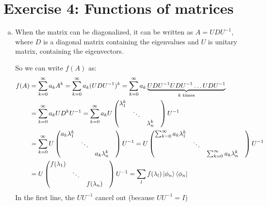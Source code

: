 \documentclass[a4paper,german,12pt,smallheadings]{scrartcl}
\begin{document}
\section*{Exercise 4: Functions of matrices}
\begin{enumerate}[a)]
  \item
    When the matrix can be diagonalized, it can be written as $A = UDU^{-1}$,
    where $D$ is a diagonal matrix containing the eigenvalues and $U$ is
    unitary matrix, containing the eigenvectors.

    So we can write $f(A)$ as:
    \begin{align*}
      f(A)
      &= \sum_{k=0}^{\infty} a_k A^k 
      = \sum_{k=0}^{\infty} a_k (UDU^{-1})^k
      = \sum_{k=0}^{\infty} a_k \underbrace{UDU^{-1}UDU^{-1} \dots UDU^{-1}}_{k\text{ times}} \\
      &= \sum_{k=0}^{\infty} a_k UD^kU^{-1}
      = \sum_{k=0}^{\infty} a_k U 
      \begin{pmatrix} 
        \lambda_1^k &             & \\
                   & \ddots      & \\
                   &             & \lambda_n^k & \\
      \end{pmatrix} 
      U^{-1} \\
      &= \sum_{k=0}^{\infty} U 
      \begin{pmatrix} 
        a_k \lambda_1^k &             & \\
                   & \ddots      & \\
                   &             & a_k\lambda_n^k & \\
      \end{pmatrix} 
      U^{-1}
      = U
      \begin{pmatrix} 
        \sum_{k=0}^{\infty }a_k \lambda_1^k &             & \\
                   & \ddots      & \\
                   &             & \sum_{k=0}^{\infty} a_k\lambda_n^k & \\
      \end{pmatrix} 
      U^{-1} \\
      &= U
      \begin{pmatrix} 
        f(\lambda_1) &             & \\
                   & \ddots      & \\
                   &             & f(\lambda_n) & \\
      \end{pmatrix} 
      U^{-1} = \sum_l f(\lambda_l) \ket{\phi_n}\bra{\phi_n}
    \end{align*}
    In the first line, the $UU^{-1}$ cancel out (because $UU^{-1} = I$)


\end{enumerate}
\end{document}
